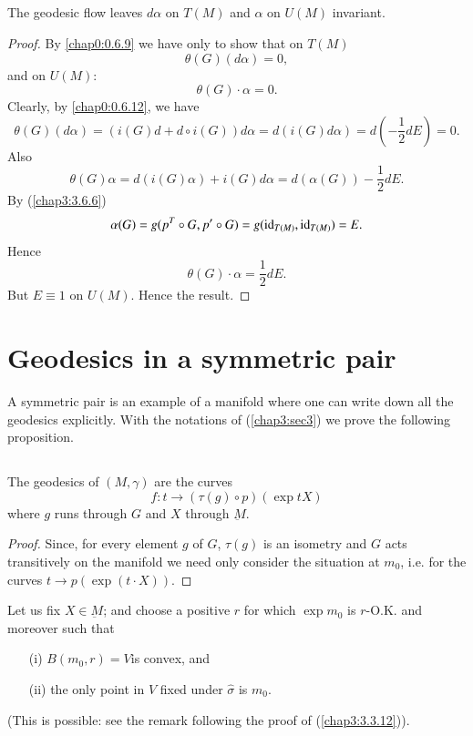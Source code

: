 \subsection{}\label{chap4:4.3.10}

\begin{prop*}
The geodesic flow leaves $d\alpha$ on $T(M)$ and $\alpha$ on $U(M)$ invariant.
\end{prop*}

\begin{proof}
By \eqref{chap0:0.6.9} we have only to show that on $T(M)$
$$
\theta(G)(d\alpha)=0,
$$
and \pageoriginale on $U(M)$:
$$
\theta(G)\cdot \alpha=0.
$$
Clearly, by \ref{chap0:0.6.12}, we have
$$
\theta(G)(d\alpha)=(i(G)d+d\circ i(G))d\alpha
=d(i(G)d\alpha)=d(-\frac{1}{2}dE)=0. 
$$
Also
$$
\theta(G)\alpha=d(i(G)\alpha)+i(G)d\alpha=d(\alpha(G))-\frac{1}{2}dE.
$$
By (\ref{chap3:3.6.6})
$$
\alpha(G)=g(p^{T}\circ G,p'\circ G)=g(\operatorname{id}_{T(M)},\operatorname{id}_{T(M)})=E.
$$
Hence
$$
\theta(G)\cdot \alpha=\frac{1}{2}dE.
$$
But $E\equiv 1$ on $U(M)$. Hence the result.
\end{proof}

\section{Geodesics in a symmetric pair}\label{chap4:chap4-sec4}

A symmetric pair is an example of a manifold where one can write down
all the geodesics explicitly. With the notations of (\ref{chap3:sec3}) we
prove the following proposition.


\subsection{}\label{chap4:4.4.1}

\begin{prop*}
The geodesics of $(M,\gamma)$ are the curves
$$
f:t\to (\tau(g)\circ p)(\exp tX)
$$
where $g$ runs through $G$ and $X$ through $\underbar{M}$.
\end{prop*}

\begin{proof}
Since, for every element $g$ of $G$, $\tau(g)$ is an isometry and $G$
acts transitively on the manifold we need only consider the situation
at $m_{0}$, i.e. for the curves $t\to p(\exp(t\cdot X))$.
\end{proof}

Let us fix $X\in\underbar{M}$; and choose a positive $r$ for which
$\exp m_{0}$ is $r$-O.K. and moreover such that 
\begin{itemize}
\item[(i)] $B(m_{0},r)=V$\pageoriginale is convex, and

\item[(ii)] the only point in $V$ fixed under $\widehat{\sigma}$ is $m_{0}$.
\end{itemize}
(This is possible: see the remark following the proof of
(\ref{chap3:3.3.12})).

